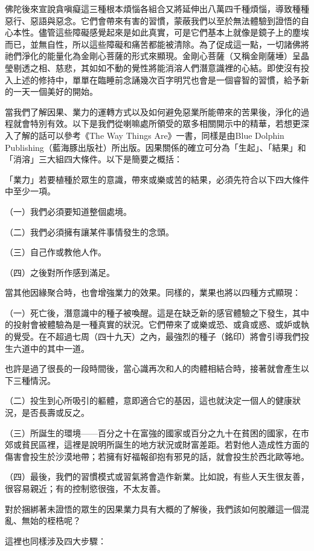 佛陀後來宣說貪嗔癡這三種根本煩惱各組合又將延伸出八萬四千種煩惱，導致種種惡行、惡語與惡念。它們會帶來有害的習慣，蒙蔽我們以至於無法體驗到證悟的自心本性。儘管這些障礙感覺起來是如此真實，可是它們基本上就像是鏡子上的塵埃而已，並無自性，所以這些障礙和痛苦都能被清除。為了促成這一點，一切諸佛將祂們淨化的能量化為金剛心菩薩的形式來顯現。金剛心菩薩（又稱金剛薩埵）呈晶瑩剔透之相、慈悲，其如如不動的覺性將能消溶人們潛意識裡的心結。即使沒有投入上述的修持中，單單在臨睡前念誦幾次百字明咒也會是一個睿智的習慣，給予新的一天一個美好的開始。

當我們了解因果、業力的運轉方式以及如何避免惡業所能帶來的苦果後，淨化的過程就會特別有效。以下是我們從喇嘛處所領受的眾多相關開示中的精華，若想更深入了解的話可以參考《The
Way Things Are》一書，同樣是由Blue Dolphin
Publishing（藍海豚出版社）所出版。因果關係的確立可分為「生起」、「結果」和「消溶」三大組四大條件。以下是簡要之概括：

「業力」若要植種於眾生的意識，帶來或樂或苦的結果，必須先符合以下四大條件中至少一項。

（一）我們必須要知道整個處境。

（二）我們必須擁有讓某件事情發生的念頭。

（三）自己作或教他人作。

（四）之後對所作感到滿足。

當其他因緣聚合時，也會增強業力的效果。同樣的，業果也將以四種方式顯現：

（一）死亡後，潛意識中的種子被喚醒。這是在缺乏新的感官體驗之下發生，其中的投射會被體驗為是一種真實的狀況。它們帶來了或樂或恐、或貪或惑、或妒或執的覺受。在不超過七周（四十九天）之內，最強烈的種子（銘印）將會引導我們投生六道中的其中一道。

也許是過了很長的一段時間後，當心識再次和人的肉體相結合時，接著就會產生以下三種情況。

（二）投生到心所吸引的軀體，意即適合它的基因，這也就決定一個人的健康狀況，是否長壽或反之。

（三）所誕生的環境——百分之十在富強的國家或百分之九十在貧困的國家，在市郊或貧民區裡，這裡是說明所誕生的地方狀況或財富差距。若對他人造成性方面的傷害會投生於沙漠地帶；若擁有好福報卻抱有邪見的話，就會投生於西北歐等地。

（四）最後，我們的習慣模式或習氣將會造作新業。比如說，有些人天生很友善，很容易親近；有的控制慾很強，不太友善。

對於捆綁著未證悟的眾生的因果業力具有大概的了解後，我們該如何脫離這一個混亂、無始的桎梏呢？

這裡也同樣涉及四大步驟：

